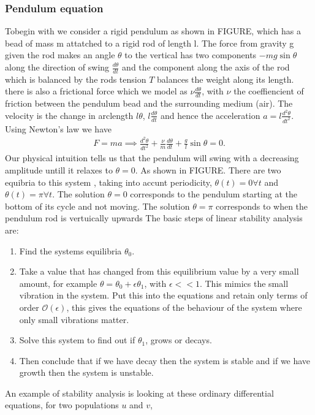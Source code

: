 \documentclass{mm2}
\numberwithin{equation}{section}
\theoremstyle{definition}
\begin{document}
\subsubsection{Pendulum equation}
Tobegin with we consider a rigid pendulum as shown in FIGURE, which has a bead of mass m attatched to a rigid rod of length l. The force from gravity g given the rod makes an angle $\theta$ to the vertical has two components $-mg\sin\theta$ along the direction of swing $\frac{d\theta}{dt}$ and the component along the axis of the rod which is balanced by the rods tension $T$ balances the weight along its length. there is also a frictional force which we model as $\nu\frac{d\theta}{dt}$, with $\nu$ the coeffiencient of friction between the pendulum bead and the surrounding medium (air). The velocity is the change in arclength $l\theta$, $l\frac{d\theta}{dt}$ and hence the acceleration $a = l \frac{d^2 \theta}{dt^2}$. Using Newton's law we have
\begin{eqnarray}
F = ma \implies \frac{d^2 \theta}{dt^2} + \frac{\nu}{m}\frac{d\theta}{dt} + \frac{g}{l}\sin\theta =0.
\end{eqnarray}
Our physical intuition tells us that the pendulum will swing with a decreasing amplitude untill it relaxes to $\theta = 0$. As shown in FIGURE. There are two equibria to this system , taking into accunt periodicity, $\theta(t) = 0 \forall t$ and $\theta(t) = \pi \forall t$. The solution $\theta = 0$ corresponds to the pendulum starting at the bottom of its cycle and not moving. The solution $\theta = \pi$ corresponds to when the pendulum rod is vertuically upwards
The basic steps of linear stability analysis are:
\begin{enumerate}
	\item Find the systems equilibria $\theta _0$.
	\item Take a value that has changed from this equilibrium value by a very small amount, for example $\theta = \theta _0 + \epsilon \theta _1$, with $\epsilon <<1$. This mimics the small vibration in the system. Put this into the equations and retain only terms of order $\mathcal{O}(\epsilon)$, this gives the equations of the behaviour of the system where only small vibrations matter.
	\item Solve this system to find out if $\theta _1$, grows or decays.
	\item Then conclude that if we have decay then the system is stable and if we have growth then the system is unstable. \cite{Prior}
\end{enumerate}
An example of stability analysis is looking at these ordinary differential equations, for two populations $u$ and $v$, \newline
\end{document}
